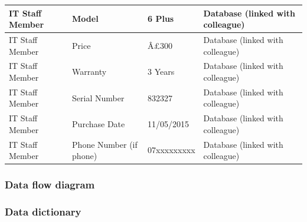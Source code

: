 \begin{table}[H]
{\begin{tabular}{|p{4cm}|p{5.3cm}|p{8cm}|p{3cm}|}
IT Staff Member                             & Model                              & 6 Plus                                             & Database (linked with colleague)                                      \\ \hline
IT Staff Member                       & Price                              & Â£300                                               & Database (linked with colleague)          \\ \hline
IT Staff Member                       & Warranty                           & 3 Years                                            & Database (linked with colleague)          \\ \hline
IT Staff Member                       & Serial Number                      & 832327                                             & Database (linked with colleague)          \\ \hline
IT Staff Member                       & Purchase Date                      & 11/05/2015                                         & Database (linked with colleague)          \\ \hline
IT Staff Member                       & Phone Number (if phone)            & 07xxxxxxxxx                                        & Database (linked with colleague)          \\ \hline
\end{tabular}
}
\end{table}

\subsubsection{Data flow diagram}

\subsubsection{Data dictionary}

